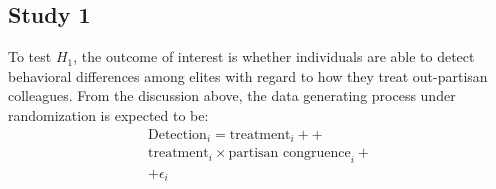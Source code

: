 \documentclass[12pt]{article}
\begin{document}
\subsection{Study 1}
To test $H_1$, the outcome of interest is whether individuals are able to detect behavioral differences among elites with regard to how they treat out-partisan colleagues. From the discussion above, the data generating process under randomization is expected to be: 
\begin{equation}
\begin{aligned}
\text{Detection}_i = \text{treatment}_i +  + \\ 
     \text{treatment}_i \times \text{partisan congruence}_i + \\ + \epsilon_i
\end{aligned}
\label{eq:study1}
\end{equation}




\end{document}
